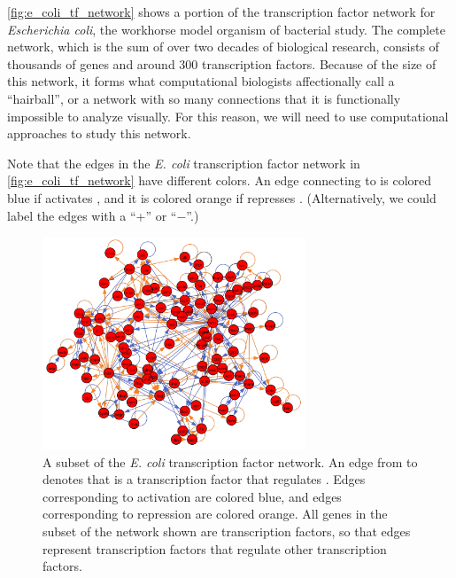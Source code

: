 \autoref{fig:e_coli_tf_network} shows a portion of the transcription factor network for \textit{Escherichia coli}, the workhorse model organism of bacterial study. The complete network, which is the sum of over two decades of biological research, consists of thousands of genes and around 300 transcription factors. Because of the size of this network, it forms what computational biologists affectionally call a ``hairball'', or a network with so many connections that it is functionally impossible to analyze visually. For this reason, we will need to use computational approaches to study this network.

Note that the edges in the \textit{E. coli} transcription factor network in \autoref{fig:e_coli_tf_network} have different colors. An edge connecting  to  is colored blue if  activates , and it is colored orange if  represses . (Alternatively, we could label the edges with a ``+'' or ``$-$''.)\\

\begin{qbox}\end{qbox}

\begin{figure}[h]
\centering
\mySfFamily
\includegraphics[width = 0.7\textwidth]{../images/e_coli_tf_network_blue_orange.png}
\caption{A subset of the \textit{E. coli} transcription factor network. An edge from  to  denotes that  is a transcription factor that regulates . Edges corresponding to activation are colored blue, and edges corresponding to repression are colored orange. All genes in the subset of the network shown are transcription factors, so that edges represent transcription factors that regulate other transcription factors.}
\label{fig:e_coli_tf_network}
\end{figure}

